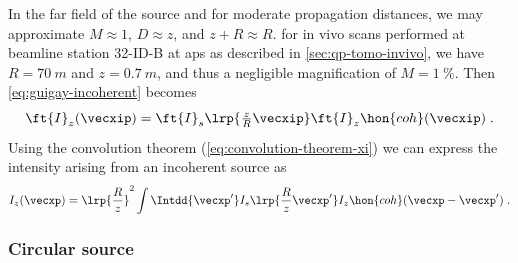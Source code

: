 \documentclass[
twoside,
openright,
titlepage,
numbers=noenddot,
headinclude,
fleqn,
a4paper,
footinclude=true,
cleardoublepage=empty,
abstractoff,
BCOR=5mm,
paper=a4,
fontsize=11pt,
british,ngerman,american,
]{scrreprt}
\begin{document}
In the far field of the source and for moderate propagation distances,
we may approximate $M\approx 1$, $D\approx z$, and $z+R\approx R$.
\Eg{} for in vivo scans performed at beamline station 32-ID-B at
\ac{aps} as described in \cref{sec:qp-tomo-invivo}, we have
$R=\SI{70}{m}$ and $z=\SI{0.7}{m}$, and thus a negligible
magnification of $M=\SI{1}{\percent}$.  Then
\cref{eq:guigay-incoherent} becomes
\begin{equation}
  \label{eq:guigay-incoherent-far-field}
    \ft{I}_z(\vecxip) = \ft{I}_s\lrp{\tfrac{z}{R}\vecxip}
    \ft{I}_z\hon{coh}(\vecxip) \;.
\end{equation}
Using the convolution theorem (\cref{eq:convolution-theorem-xi}) we
can express the intensity arising from an incoherent source as
\begin{equation}
  \label{eq:intensity-incoherent-far-field}
  I_z(\vecxp) = \lrp{\frac{R}{z}}^2 \int\Intdd{\vecxp'}
   I_s\lrp{\frac{R}{z}\vecxp'}  I_z\hon{coh}(\vecxp-\vecxp') \;.
\end{equation}


\subsubsection{Circular source}
\label{sec:circular-source}
\end{document}
